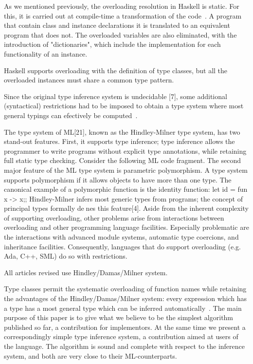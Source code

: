 \documentclass[hidelinks, twocolumn]{article}
\begin{document}
As we mentioned previously, the overloading resolution in Haskell is static. For this, it is carried out 
at compile-time a transformation of the code~\cite{wadlerBlott:popl89}. A program that contain class and instance declarations it is translated to an equivalent program that does not. The overloaded variables are also eliminated, with the introduction of "dictionaries", which include the implementation for each functionality of an instance.   

Haskell supports overloading with the definition of type classes, but all the overloaded instances must share a common type pattern.

Since the original type inference system is undecidable [7], some additional (syntactical) restrictions had to be imposed to obtain a type system where most general typings can efectively be computed~\cite{SEIDL199457}.

The type system of ML[21], known as the Hindley-Milner type system, has two stand-out features. First, it supports type inference; type inference allows the programmer to write programs without explicit type annotations, while retaining full static type checking. Consider the following ML code fragment. The second major feature of the ML type system is parametric polymorphism. A type system supports polymorphism if it allows objects to have more than one type. The canonical example of a polymorphic function is the identity function:
let id = fun x -> x;; Hindley-Milner infers most generic types
from programs; the concept of principal types formally denes this feature[4].
Aside from the inherent complexity of supporting
overloading, other problems arise from interactions between overloading and
other programming language facilities. Especially problematic are the interactions
with advanced module systems, automatic type coercions, and inheritance facilities.
Consequently, languages that do support overloading (e.g. Ada, C++, SML) do so
with restrictions.

All articles revised use Hindley/Damas/Milner system.

Type classes permit the systematic overloading
of function names while retaining the advantages of the
Hindley/Damas/Milner system: every expression which
has a type has a most general type which can be inferred
automatically~\cite{Nipkow1993}. The main purpose of this paper is to give
what we believe to be the simplest algorithm published
so far, a contribution for implementors. At the same
time we present a correspondingly simple type inference
system, a contribution aimed at users of the language.
The algorithm is sound and complete with respect to
the inference system, and both are very close to their
ML-counterparts.
\end{document}
